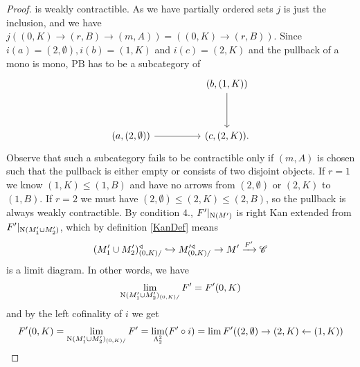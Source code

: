 \documentclass[../../thesis.tex]{subfiles}
\begin{document}
\begin{proof}
    is weakly contractible.
    As we have partially ordered sets
    $j$ is just the inclusion, and we have $j((0,K) \to (r, B) \to (m,A))=((0,K) \to (r,B))$.
    Since $i(a)=(2,\emptyset), i(b)=(1,K)$ and $i(c)=(2,K)$ and the pullback of a mono is mono, $\mathrm{PB}$ has to be a subcategory of
    \[\begin{tikzcd}
            && {(b,(1,K))} \\
            \\
            {(a,(2,\emptyset))} && {(c,(2,K))}
            \arrow[from=3-1, to=3-3]
            \arrow[from=1-3, to=3-3].
        \end{tikzcd}\]
    Observe that such a subcategory fails to be contractible only if $(m,A)$ is chosen such that the pullback is either empty or consists of two disjoint objects.
    If $r=1$ we know $(1,K) \leq (1,B)$ and have no arrows from $(2,\emptyset)$ or $(2,K)$ to $(1,B)$.
    If $r=2$ we must have $(2,\emptyset) \leq (2,K) \leq (2,B)$, so the pullback is always weakly contractible.
    By condition $4.$, $F'|_{\mathrm{N}(M')}$ is right Kan extended from $F'|_{\mathrm{N}(M_1' \cup M_2')}$, which by definition \ref{KanDef} means
    \[
        (M_1' \cup M_2')^{\triangleleft}_{(0,K)/} \hookrightarrow M'^{\triangleleft}_{(0,K)/}\rightarrow M' \xrightarrow{F'} \mathscr{C}
    \]
    is a limit diagram.
    In other words, we have
    \[
        \lim_{\mathrm{N}(M_1' \cup M_2')_{(0,K)/}}F' = F'(0,K)
    \]
    and by the left cofinality of $i$ we get
    \[
        F'(0,K) = \lim_{\mathrm{N}(M_1' \cup M_2')_{(0,K)/}}F' = \lim_{\Lambda_2^2}(F'\circ i) = \lim F'((2,\emptyset) \rightarrow (2,K) \leftarrow (1,K))
    \]


\end{proof}
\end{document}
